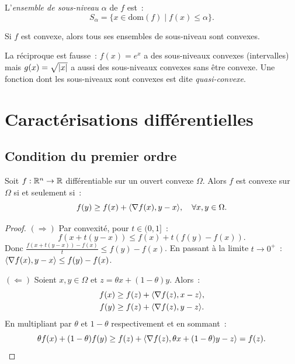 \begin{definition}
L'\emph{ensemble de sous-niveau $\alpha$} de $f$ est~:
\[
    S_\alpha = \{x \in \mathrm{dom}(f) \mid f(x) \leq \alpha\}.
\]
\end{definition}

\begin{proposition}
Si $f$ est convexe, alors tous ses ensembles de sous-niveau sont convexes.
\end{proposition}

\begin{attention}[title=\textbf{R\'eciproque fausse}]
La r\'eciproque est fausse~: $f(x) = e^x$ a des sous-niveaux convexes (intervalles)
mais $g(x) = \sqrt{\left| x \right|}$ a aussi des sous-niveaux convexes sans \^etre convexe.
Une fonction dont les sous-niveaux sont convexes est dite \emph{quasi-convexe}.
\end{attention}

\section{Caract\'erisations diff\'erentielles}

\subsection{Condition du premier ordre}

\begin{theoreme}
\label{thm:premier_ordre}
Soit $f : \mathbb{R}^n \to \mathbb{R}$ diff\'erentiable sur un ouvert convexe $\Omega$. Alors
$f$ est convexe sur $\Omega$ si et seulement si~:
\[
    f(y) \geq f(x) + \langle \nabla f(x), y - x \rangle, \quad \forall x, y \in \Omega.
\]
\end{theoreme}

\begin{proof}
$(\Rightarrow)$ Par convexit\'e, pour $t \in (0,1]$~:
\[
    f(x + t(y-x)) \leq f(x) + t(f(y) - f(x)).
\]
Donc $\frac{f(x+t(y-x)) - f(x)}{t} \leq f(y) - f(x)$. En passant \`a la limite
$t \to 0^+$~: $\langle \nabla f(x), y-x \rangle \leq f(y) - f(x)$.

$(\Leftarrow)$ Soient $x, y \in \Omega$ et $z = \theta x + (1-\theta)y$. Alors~:
\begin{align*}
    f(x) &\geq f(z) + \langle \nabla f(z), x - z \rangle, \\
    f(y) &\geq f(z) + \langle \nabla f(z), y - z \rangle.
\end{align*}
En multipliant par $\theta$ et $1-\theta$ respectivement et en sommant~:
\[
    \theta f(x) + (1-\theta)f(y) \geq f(z) + \langle \nabla f(z), \theta x + (1-\theta)y - z \rangle = f(z).
\]
\end{proof}

